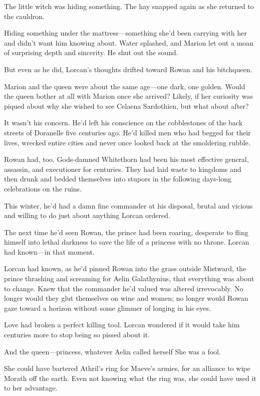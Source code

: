 The little witch was hiding something. The hay snapped again as she returned to the cauldron.

Hiding something under the mattress---something she'd been carrying with her and didn't want him knowing about. Water splashed, and Marion let out a moan of surprising depth and sincerity. He shut out the sound.

But even as he did, Lorcan's thoughts drifted toward Rowan and his bitchqueen.

Marion and the queen were about the same age---one dark, one golden. Would the queen bother at all with Marion once she arrived? Likely, if her curiosity was piqued about why she wished to see Celaena Sardothien, but  what about after?

It wasn't his concern. He'd left his conscience on the cobblestones of the back streets of Doranelle five centuries ago. He'd killed men who had begged for their lives, wrecked entire cities and never once looked back at the smoldering rubble.

Rowan had, too. Gods-damned Whitethorn had been his most effective general, assassin, and executioner for centuries. They had laid waste to kingdoms and then drunk and bedded themselves into stupors in the following days-long celebrations on the ruins.

This winter, he'd had a damn fine commander at his disposal, brutal and vicious and willing to do just about anything Lorcan ordered.

The next time he'd seen Rowan, the prince had been roaring, desperate to fling himself into lethal darkness to save the life of a princess with no throne. Lorcan had known---in that moment.

Lorcan had known, as he'd pinned Rowan into the grass outside Mistward, the prince thrashing and screaming for Aelin Galathynius, that everything was about to change. Knew that the commander he'd valued was altered irrevocably. No longer would they glut themselves on wine and women; no longer would Rowan gaze toward a horizon without some glimmer of longing in his eyes.

Love had broken a perfect killing tool. Lorcan wondered if it would take him centuries more to stop being so pissed about it.

And the queen---princess, whatever Aelin called herself  She was a fool.

She could have bartered Athril's ring for Maeve's armies, for an alliance to wipe Morath off the earth. Even not knowing what the ring was, she could have used it to her advantage.

